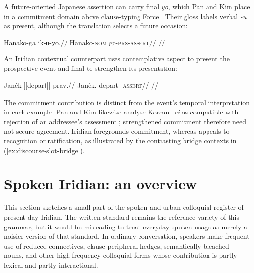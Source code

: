 A future-oriented Japanese assertion can carry final \textit{yo}, which
Pan and Kim place in a commitment domain above clause-typing Force
\cite[§2.2, example~5b]{pankim2026particles}. Their gloss labels verbal
\textit{-u} as present, although the translation selects a future occasion:

\ex\label{ex:japanese-yo-commitment}%
\begingl
\gla Hanako-ga ik-u-yo.//
\glb Hanako-\textsc{nom} go-\textsc{prs}-\textsc{assert}//
\glft {} //
\endgl
\xe

An Iridian contextual counterpart uses contemplative aspect to present the
prospective event and final  to strengthen its presentation:

\ex\label{ex:iridian-prav-departure}%
\begingl
\gla Janėk \textnormal{[[depart]]}\textsubscript{\Ctpl{}} prav.//
\glb Janėk.\Dir{} depart-\Ctpl{} \textsc{assert}//
\glft {}
//
\endgl
\xe

The commitment contribution is distinct from the event's temporal
interpretation in each example. Pan and Kim likewise analyse Korean
\textit{-ci} as compatible with rejection of an addressee's assessment
\cite[§2.2.1, example~8]{pankim2026particles}; strengthened commitment
therefore need not secure agreement. Iridian  foregrounds
commitment, whereas  appeals to recognition or ratification, as
illustrated by the contrasting bridge contexts in
(\ref{ex:discourse-slot-bridge}).

%
%

\section{Spoken Iridian: an overview}\label{sec:spoken-overview}

This section sketches a small part of the spoken and urban colloquial register
of present-day Iridian. The written standard remains the reference variety of
this grammar, but it would be misleading to treat everyday spoken usage as
merely a noisier version of that standard. In ordinary conversation, speakers
make frequent use of reduced connectives, clause-peripheral hedges, semantically
bleached nouns, and other high-frequency colloquial forms whose contribution is
partly lexical and partly interactional.

